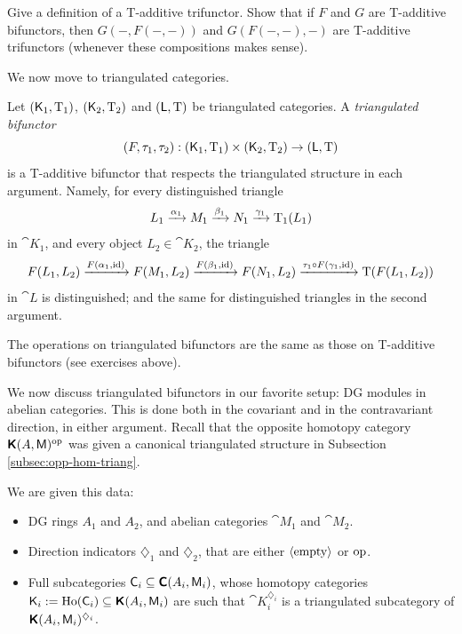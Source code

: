 \begin{exer} \label{exer:1971}
Give a definition of a T-additive trifunctor. Show that if $F$ and $G$ are 
T-additive bifunctors, then $G(-, F(-, -))$ and $G(F(-, -), -)$
are T-additive trifunctors (whenever these compositions makes sense). 
\end{exer}

We now move to triangulated categories. 

\begin{dfn} \label{dfn:1971}
Let $(\operatorname{\mathsf{K}}_1, \operatorname{T}_1)$, $(\operatorname{\mathsf{K}}_2, \operatorname{T}_2)$ 
and $(\operatorname{\mathsf{L}}, \operatorname{T})$ be triangulated categories. 
A {\em triangulated bifunctor}%
\[ (F, \tau_1, \tau_2) : (\operatorname{\mathsf{K}}_1, \operatorname{T}_1) \times (\operatorname{\mathsf{K}}_2, \operatorname{T}_2) 
\to (\operatorname{\mathsf{L}}, \operatorname{T}) \]
is a T-additive bifunctor that respects the triangulated structure in each 
argument. Namely, for every distinguished triangle 
\[ L_1 \xrightarrow{\alpha_1} M_1 \xrightarrow{\beta_1} N_1 \xrightarrow{\gamma_1} \operatorname{T}_1(L_1) \]
in $\cat{K}_1$, and every object $L_2 \in \cat{K}_2$,
the triangle 
\[ F(L_1, L_2) \xrightarrow{F(\alpha_1, \operatorname{id})} 
F(M_1, L_2) \xrightarrow{F(\beta_1, \operatorname{id})} 
F(N_1, L_2) \xrightarrow{\tau_1 \circ F(\gamma_1, \operatorname{id})} 
\operatorname{T}(F(L_1, L_2)) \]
in $\cat{L}$ is distinguished; and the same for distinguished triangles in the 
second argument. 
\end{dfn}

The operations on triangulated bifunctors are the same as those on T-additive 
bifunctors (see exercises above). 

We now discuss triangulated bifunctors in our favorite setup:
DG modules in abelian categories. This is done both in the covariant and in 
the contravariant direction, in either argument.
Recall that the opposite homotopy category
$\boldsymbol{\mathsf{K}}(A, \operatorname{\mathsf{M}})^{\mathrm{op}}$
was given a canonical triangulated structure in Subsection 
\ref{subsec:opp-hom-triang}.

\begin{setup} \label{set:3231}
We are given this data:
\begin{itemize}
\item DG rings $A_1$ and $A_2$, and abelian categories $\cat{M}_1$ and 
$\cat{M}_2$.

\item Direction indicators $\diamondsuit_1$ and $\diamondsuit_2$, that are 
either $\langle \mathrm{empty} \rangle$ or $\mathrm{op}$. 

\item Full subcategories 
$\operatorname{\mathsf{C}}_i \subseteq \boldsymbol{\mathsf{C}}(A_i, \operatorname{\mathsf{M}}_i)$, whose homotopy categories 
$\cat{K}_i := \lb \opn{Ho}(\cat{C}_i) \sub \dcat{K}(A_i, \cat{M}_i)$
are such that $\cat{K}_i^{\diamondsuit_i}$ is a triangulated subcategory of 
$\boldsymbol{\mathsf{K}}(A_i, \operatorname{\mathsf{M}}_i)^{\diamondsuit_i}$.
\end{itemize} 
\end{setup}

